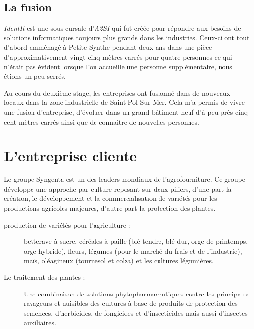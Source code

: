 
\subsection{La fusion} %
\label{sub:La fusion}

\emph{IdentIt} est une sous-cursale d'\emph{A2SI} qui fut créée pour
répondre aux besoins de solutions informatiques toujours plus grands dans
les industries. Ceux-ci ont tout d'abord emménagé à Petite-Synthe
pendant deux ans dans une pièce d'approximativement vingt-cinq mètres
carrés pour quatre personnes ce qui n'était pas évident lorsque l'on
accueille une personne supplémentaire, nous étions un peu serrés.

Au cours du deuxième stage, les entreprises ont \og fusionné \fg{} dans
de nouveaux locaux dans la zone industrielle de Saint Pol Sur Mer. Cela
m'a permis de vivre une fusion d'entreprise, d'évoluer dans un grand
bâtiment neuf d'à peu près cinq-cent mètres carrés ainsi que de
connaitre de nouvelles personnes.



\section{L'entreprise cliente} %
\label{sec:L'entreprise cliente}

Le groupe Syngenta est un des leaders mondiaux de l’agrofourniture.  Ce
groupe développe une approche par culture reposant sur deux piliers,
d'une part la création, le développement et la commercialisation de
variétés pour les productions agricoles majeures, d'autre part la
protection des plantes.

\begin{description}

  \item[production de variétés pour l'agriculture :] betterave à sucre,
    céréales à paille (blé tendre, blé dur, orge de printemps, orge
    hybride), fleurs, légumes (pour le marché du frais et de
    l’industrie), maïs, oléagineux (tournesol et colza) et les cultures
    légumières.

  \item[Le traitement des plantes :] Une combinaison de solutions
    phytopharmaceutiques contre les principaux ravageurs et nuisibles
    des cultures à base de produits de protection des semences,
    d’herbicides, de fongicides et d’insecticides mais aussi d’insectes
    auxiliaires.

\end{description}


